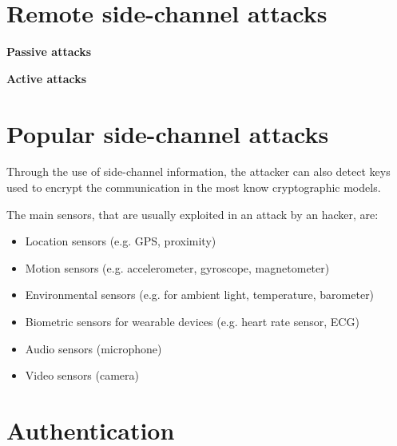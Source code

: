 \section{Remote side-channel attacks}
\textbf{Passive attacks}
\begin{itemize}
{}
{}
{}
{}
{}
{}
{}
{}
{}
\end{itemize}
\textbf{Active attacks}
\begin{itemize}
{}
\end{itemize}



\section{Popular side-channel attacks}
Through the use of side-channel information, the attacker can also detect keys used to encrypt the communication in the most know cryptographic models.
\begin{itemize}
{The main sensors, that are usually exploited in an attack by an hacker, are\cite{}:
\begin{itemize}
\item{Location sensors (e.g. GPS, proximity)}
\item{Motion sensors (e.g. accelerometer, gyroscope, magnetometer)}
\item{Environmental sensors (e.g. for ambient light, temperature, barometer)}
\item{Biometric sensors for wearable devices (e.g. heart rate sensor, ECG)}
\item{Audio sensors (microphone)}
\item{Video sensors (camera)}
\end{itemize}}
\end{itemize}

\section{Authentication}
